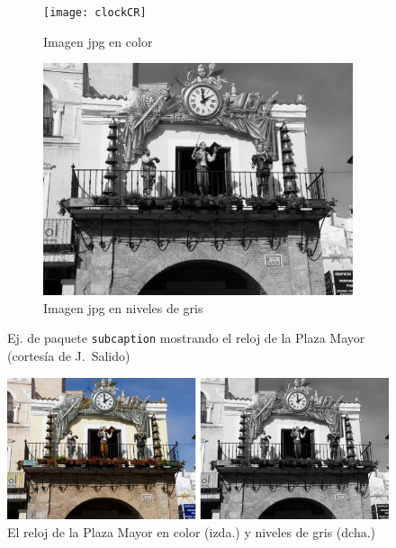 \documentclass[11pt,a4paper]{article}
\begin{document}
\begin{figure}[htb]
	\centering
	\begin{subfigure}[b]{0.3\linewidth}
		\centering
		\texttt{[image: clockCR]}
		\caption{Imagen jpg en color}\label{fig:clockCR}
	\end{subfigure}
	\begin{subfigure}[b]{0.3\linewidth}
		\centering
		\includegraphics[width=0.8\linewidth]{clockCRbw}
		\caption{Imagen jpg en niveles de gris}\label{fig:clockCRbw}
	\end{subfigure}
	\caption[Comparación jpg color y niveles de gris]{Ej. de paquete \texttt{subcaption} mostrando el reloj de la Plaza Mayor (cortesía de J.~Salido)}
	\label{fig:clock}
\end{figure}



\begin{figure}[htb]
	\centering
		\includegraphics[width=0.6\linewidth]{2clockCR}
		\caption[Varias imágenes como una]{El reloj de la Plaza Mayor en color (izda.) y niveles de gris (dcha.)}
	\label{fig:2clock}
\end{figure}
\end{document}
